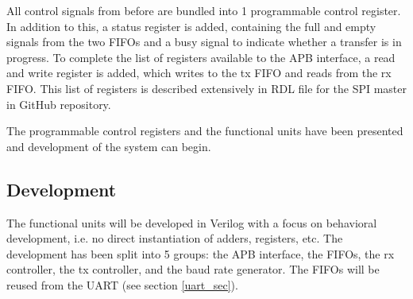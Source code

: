 \documentclass[./dissertation.tex]{subfiles}
\begin{document}
All control signals from before are bundled into 1 programmable control register. In addition to this, a status register is added, containing the full and empty signals from the two FIFOs and a busy signal to indicate whether a transfer is in progress. To complete the list of registers available to the APB interface, a read and write register is added, which writes to the tx FIFO and reads from the rx FIFO. This list of registers is described extensively in RDL file for the SPI master in GitHub repository.

The programmable control registers and the functional units have been presented and development of the system can begin.

\subsection{Development}
The functional units will be developed in Verilog with a focus on behavioral development, i.e. no direct instantiation of adders, registers, etc. The development has been split into 5 groups: the APB interface, the FIFOs, the rx controller, the tx controller, and the baud rate generator. The FIFOs will be reused from the UART (see section \ref{uart_sec}). 
\end{document}
